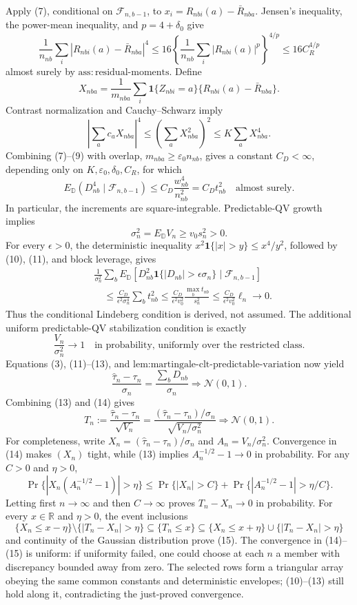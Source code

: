 Apply (7), conditional on \(\mathcal F_{n,b-1}\), to
\(x_i=R_{nbi}(a)-\bar R_{nba}\).  Jensen's inequality, the power-mean inequality, and \(p=4+\delta_0\) give
\[
\frac1{n_{nb}}\sum_i|R_{nbi}(a)-\bar R_{nba}|^4
\le16\left\{\frac1{n_{nb}}\sum_i|R_{nbi}(a)|^p\right\}^{4/p}
\le16C_R^{4/p}
\tag{8}
\]
almost surely by \(\mathrm{ass:residual\text{-}moments}\).  Define
\[
X_{nba}=\frac1{m_{nba}}\sum_i\mathbf1\{Z_{nbi}=a\}
\{R_{nbi}(a)-\bar R_{nba}\}.
\]
Contrast normalization and Cauchy--Schwarz imply
\[
\left|\sum_ac_aX_{nba}\right|^4
\le\left(\sum_aX_{nba}^2\right)^2
\le K\sum_aX_{nba}^4.
\tag{9}
\]
Combining (7)--(9) with overlap, \(m_{nba}\ge\varepsilon_0n_{nb}\), gives a constant \(C_D<\infty\), depending only on \(K,\varepsilon_0,\delta_0,C_R\), for which
\[
E_{\mathbb D}(D_{nb}^4\mid\mathcal F_{n,b-1})
\le C_D\frac{w_{nb}^4}{n_{nb}^2}=C_Dt_{nb}^2
\quad\text{almost surely}.
\tag{10}
\]
In particular, the increments are square-integrable.  Predictable-QV growth implies
\[
\sigma_n^2=E_{\mathbb D}V_n\ge v_0s_n^2>0.
\tag{11}
\]
For every \(\epsilon>0\), the deterministic inequality
\(x^2\mathbf1\{|x|>y\}\le x^4/y^2\), followed by (10), (11), and block leverage, gives
\[
\begin{aligned}
&\frac1{\sigma_n^2}\sum_bE_{\mathbb D}\!\left[D_{nb}^2
 \mathbf1\{|D_{nb}|>\epsilon\sigma_n\}\mid\mathcal F_{n,b-1}\right]\\
&\quad\le\frac{C_D}{\epsilon^2\sigma_n^4}\sum_bt_{nb}^2
\le\frac{C_D}{\epsilon^2v_0^2}
 \frac{\max_bt_{nb}}{s_n^2}
\le\frac{C_D}{\epsilon^2v_0^2}\ell_n
\longrightarrow0.
\end{aligned}
\tag{12}
\]
Thus the conditional Lindeberg condition is derived, not assumed.  The additional uniform predictable-QV stabilization condition is exactly
\[
\frac{V_n}{\sigma_n^2}\longrightarrow1
\quad\text{in probability, uniformly over the restricted class}.
\tag{13}
\]
Equations (3), (11)--(13), and \(\text{lem:martingale-clt-predictable-variation}\) now yield
\[
\frac{\widehat\tau_n-\tau_n}{\sigma_n}
=\frac{\sum_bD_{nb}}{\sigma_n}\Rightarrow\mathcal N(0,1).
\tag{14}
\]
Combining (13) and (14) gives
\[
T_n:=\frac{\widehat\tau_n-\tau_n}{\sqrt{V_n}}
=\frac{(\widehat\tau_n-\tau_n)/\sigma_n}{\sqrt{V_n/\sigma_n^2}}
\Rightarrow\mathcal N(0,1).
\tag{15}
\]
For completeness, write \(X_n=(\widehat\tau_n-\tau_n)/\sigma_n\) and \(A_n=V_n/\sigma_n^2\).  Convergence in (14) makes \((X_n)\) tight, while (13) implies \(A_n^{-1/2}-1\to0\) in probability.  For any \(C>0\) and \(\eta>0\),
\[
\Pr\{|X_n(A_n^{-1/2}-1)|>\eta\}
\le \Pr\{|X_n|>C\}+\Pr\{|A_n^{-1/2}-1|>\eta/C\}.
\]
Letting first \(n\to\infty\) and then \(C\to\infty\) proves \(T_n-X_n\to0\) in probability.  For every \(x\in\mathbb R\) and \(\eta>0\), the event inclusions
\[
\{X_n\le x-\eta\}\setminus\{|T_n-X_n|>\eta\}
\subseteq\{T_n\le x\}
\subseteq\{X_n\le x+\eta\}\cup\{|T_n-X_n|>\eta\}
\]
and continuity of the Gaussian distribution prove (15).  The convergence in (14)--(15) is uniform: if uniformity failed, one could choose at each \(n\) a member with discrepancy bounded away from zero.  The selected rows form a triangular array obeying the same common constants and deterministic envelopes; (10)--(13) still hold along it, contradicting the just-proved convergence.

